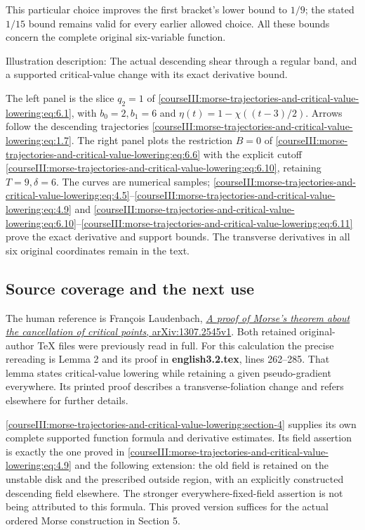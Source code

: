 This particular choice improves the first bracket's lower bound to \(1/9\); the stated \(1/15\) bound remains valid for every earlier allowed choice. All these bounds concern the complete original six-variable function.

Illustration description: The actual descending shear through a regular band, and a supported critical-value change with its exact derivative bound.

The left panel is the slice \(q_2=1\) of \eqref{courseIII:morse-trajectories-and-critical-value-lowering:eq:6.1}, with \(b_0=2,b_1=6\) and \(\eta(t)=1-\chi((t-3)/2)\). Arrows follow the descending trajectories \eqref{courseIII:morse-trajectories-and-critical-value-lowering:eq:1.7}. The right panel plots the restriction \(B=0\) of \eqref{courseIII:morse-trajectories-and-critical-value-lowering:eq:6.6} with the explicit cutoff \eqref{courseIII:morse-trajectories-and-critical-value-lowering:eq:6.10}, retaining \(T=9,\delta=6\). The curves are numerical samples; \eqref{courseIII:morse-trajectories-and-critical-value-lowering:eq:4.5}--\eqref{courseIII:morse-trajectories-and-critical-value-lowering:eq:4.9} and \eqref{courseIII:morse-trajectories-and-critical-value-lowering:eq:6.10}--\eqref{courseIII:morse-trajectories-and-critical-value-lowering:eq:6.11} prove the exact derivative and support bounds. The transverse derivatives in all six original coordinates remain in the text.

\subsection{Source coverage and the next use}
\label{courseIII:morse-trajectories-and-critical-value-lowering:trajectory-lowering-sources}

\label{courseIII:morse-trajectories-and-critical-value-lowering:section-7}

The human reference is François Laudenbach, \href{https://arxiv.org/abs/1307.2545v1}{\emph{A proof of Morse's theorem about the cancellation of critical points}, arXiv:1307.2545v1}. Both retained original-author TeX files were previously read in full. For this calculation the precise rereading is Lemma 2 and its proof in \textbf{english3.2.tex}, lines 262--285. That lemma states critical-value lowering while retaining a given pseudo-gradient everywhere. Its printed proof describes a transverse-foliation change and refers elsewhere for further details.

\cref{courseIII:morse-trajectories-and-critical-value-lowering:section-4} supplies its own complete supported function formula and derivative estimates. Its field assertion is exactly the one proved in \eqref{courseIII:morse-trajectories-and-critical-value-lowering:eq:4.9} and the following extension: the old field is retained on the unstable disk and the prescribed outside region, with an explicitly constructed descending field elsewhere. The stronger everywhere-fixed-field assertion is not being attributed to this formula. This proved version suffices for the actual ordered Morse construction in Section 5.

